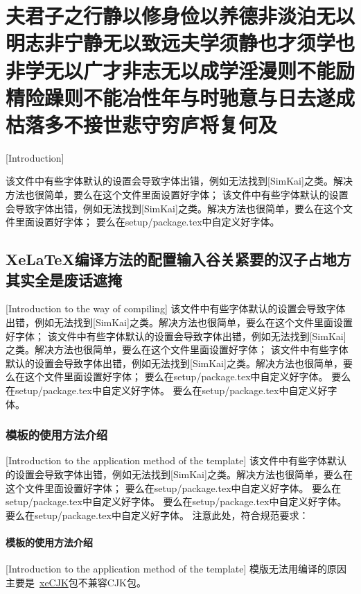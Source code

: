 
\chapter{夫君子之行静以修身俭以养德非淡泊无以明志非宁静无以致远夫学须静也才须学也非学无以广才非志无以成学淫漫则不能励精险躁则不能冶性年与时驰意与日去遂成枯落多不接世悲守穷庐将复何及}[Introduction]

该文件中有些字体默认的设置会导致字体出错，例如无法找到[SimKai]之类。解决方法也很简单，要么在这个文件里面设置好字体；
该文件中有些字体默认的设置会导致字体出错，例如无法找到[SimKai]之类。解决方法也很简单，要么在这个文件里面设置好字体；
要么在setup/package.tex中自定义好字体。
\section{XeLaTeX编译方法的配置输入谷关紧要的汉子占地方其实全是废话遮掩}[Introduction to the \XeLaTeX way of compiling]
该文件中有些字体默认的设置会导致字体出错，例如无法找到[SimKai]之类。解决方法也很简单，要么在这个文件里面设置好字体；
该文件中有些字体默认的设置会导致字体出错，例如无法找到[SimKai]之类。解决方法也很简单，要么在这个文件里面设置好字体；
该文件中有些字体默认的设置会导致字体出错，例如无法找到[SimKai]之类。解决方法也很简单，要么在这个文件里面设置好字体；
要么在setup/package.tex中自定义好字体。
要么在setup/package.tex中自定义好字体。
要么在setup/package.tex中自定义好字体。
\subsection{模板的使用方法介绍}[Introduction to the application method of the template]
该文件中有些字体默认的设置会导致字体出错，例如无法找到[SimKai]之类。解决方法也很简单，要么在这个文件里面设置好字体；
要么在setup/package.tex中自定义好字体。
要么在setup/package.tex中自定义好字体。
要么在setup/package.\cite{kanamori1998shaking}tex中自定义好字体。
要么在setup/package.tex中自定义好字体。
注意此处，符合规范要求：
\subsubsection{模板的使用方法介绍}[Introduction to the application method of the template]
模版无法用\XeLaTeX 编译的原因主要是~\href{http://bay.uchicago.edu/tex-archive/macros/xetex/latex/xecjk/xeCJK.pdf}{xeCJK}包不兼容CJK包。
